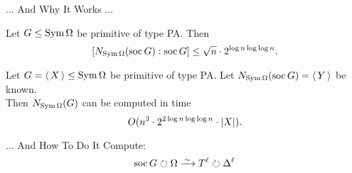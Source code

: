 \begin{frame}{... And Why It Works ...}
    \begin{lemma}
        Let $G \leq \operatorname{Sym} \Omega$ be primitive of type PA.
        Then
        \vspace{-0.5em}
        \[
            [ N_{\operatorname{Sym} \Omega}(\operatorname{soc} G) : \operatorname{soc} G ]
            \leq \sqrt n \cdot 2 ^ {\log n \log \log n}.
        \]
    \end{lemma}
    \pause

    \begin{lemma}
        Let $G =  \left\langle \, X \, \right\rangle  \leq \operatorname{Sym} \Omega$ be primitive of type PA.
        Let
        $N_{\operatorname{Sym} \Omega}(\operatorname{soc} G) =  \left\langle \, Y \, \right\rangle $ be known.
        \\
        \pause
        Then $N_{\operatorname{Sym} \Omega}(G)$ can be computed in time
        \vspace{-0.5em}
        \[
            O(n ^ 3 \cdot 2 ^ {2 \log n \log \log n} \cdot  \left| X \right| ).
        \]
    \end{lemma}
\end{frame}


\begin{frame}{... And How To Do It}
    Compute:
    \[
        \soc G \circlearrowright \Omega
        \iso
        T ^ \ell \circlearrowright \Delta ^ \ell
    \]
\end{frame}

